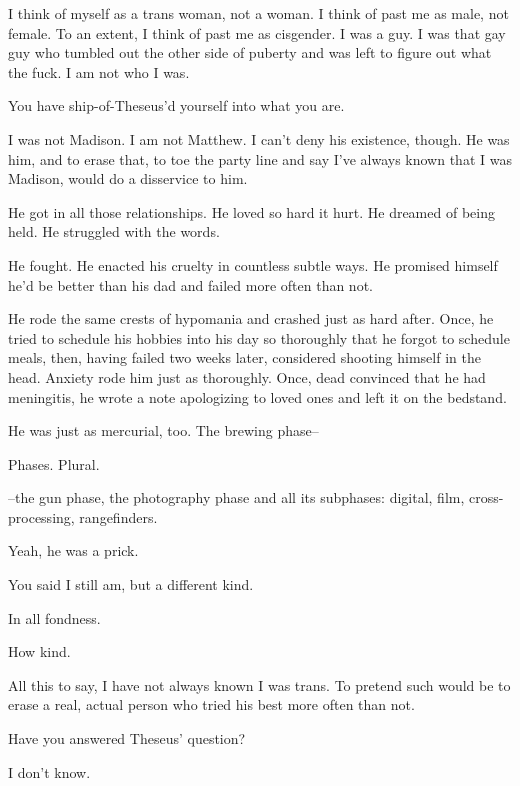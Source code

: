 \label{ally:7}
\begin{paracol}{2}
  \begin{leftcolumn}

\noindent I think of myself as a trans woman, not a woman. I think of past me as male, not female. To an extent, I think of past me as cisgender. I was a guy. I was that gay guy who tumbled out the other side of puberty and was left to figure out what the fuck. I am not who I was.

\begin{ally}
You have ship-of-Theseus'd yourself into what you are.
\end{ally}
I was not Madison. I am not Matthew. I can't deny his existence, though. He was him, and to erase that, to toe the party line and say I've always known that I was Madison, would do a disservice to him.

He got in all those relationships. He loved so hard it hurt. He dreamed of being held. He struggled with the words.

He fought. He enacted his cruelty in countless subtle ways. He promised himself he'd be better than his dad and failed more often than not.

He rode the same crests of hypomania and crashed just as hard after. Once, he tried to schedule his hobbies into his day so thoroughly that he forgot to schedule meals, then, having failed two weeks later, considered shooting himself in the head. Anxiety rode him just as thoroughly. Once, dead convinced that he had meningitis, he wrote a note apologizing to loved ones and left it on the bedstand.

He was just as mercurial, too. The brewing phase--

\begin{ally}
Phases. Plural.
\end{ally}
--the gun phase, the photography phase and all its subphases: digital, film, cross-processing, rangefinders.

\begin{ally}
Yeah, he was a prick.
\end{ally}
You said I still am, but a different kind.

\begin{ally}
In all fondness.
\end{ally}
How kind.

All this to say, I have not always known I was trans. To pretend such would be to erase a real, actual person who tried his best more often than not.

\begin{ally}
Have you answered Theseus' question?
\end{ally}
I don't know.

\newpage
\end{leftcolumn}
\end{paracol}
